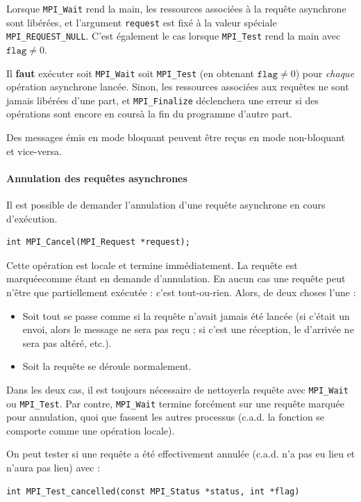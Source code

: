 Lorsque \verb|MPI_Wait| rend la main, les ressources associées à la requête
asynchrone sont libérées, et l'argument \verb|request| est fixé à la valeur
spéciale \verb|MPI_REQUEST_NULL|. C'est également le cas lorsque \verb|MPI_Test|
rend la main avec $\texttt{flag} \neq 0$.

\begin{danger}
  Il \textbf{faut} exécuter soit \verb|MPI_Wait| soit \verb|MPI_Test| (en
  obtenant $\texttt{flag} \neq 0$) pour \emph{chaque} opération asynchrone
  lancée. Sinon, les ressources associées aux requêtes ne sont jamais libérées
  d'une part, et \verb|MPI_Finalize| déclenchera une erreur si des opérations
  sont encore \og en cours\fg à la fin du programme d'autre part.
\end{danger}

Des messages émis en mode bloquant peuvent être reçus en mode non-bloquant et
vice-versa.

\paragraph{Annulation des requêtes asynchrones} Il est possible de demander
l'annulation d'une requête asynchrone en cours d'exécution.
\begin{verbatim}
int MPI_Cancel(MPI_Request *request);
\end{verbatim}

Cette opération est locale et termine immédiatement. La requête est \og
marquée\fg comme étant \og en demande d'annulation\fg. En aucun cas une requête
peut n'être que partiellement exécutée : c'est tout-ou-rien. Alors, de deux
choses l'une :
\begin{itemize}
\item Soit tout se passe comme si la requête n'avait jamais été lancée (si
c'était un envoi, alors le message ne sera pas reçu ; si c'est une réception, le
 d'arrivée ne sera pas altéré, etc.).
\item Soit la requête se déroule normalement.
\end{itemize}

\medskip

Dans les deux cas, il est toujours nécessaire de \og nettoyer\fg la requête avec
\verb|MPI_Wait| ou \verb|MPI_Test|. Par contre, \verb|MPI_Wait| termine
forcément sur une requête marquée pour annulation, quoi que fassent les autres
processus (c.a.d. la fonction se comporte comme une opération locale).

On peut tester si une requête a été effectivement annulée (c.a.d. n'a pas eu
lieu et n'aura pas lieu) avec :
\begin{verbatim}
int MPI_Test_cancelled(const MPI_Status *status, int *flag)
\end{verbatim}

